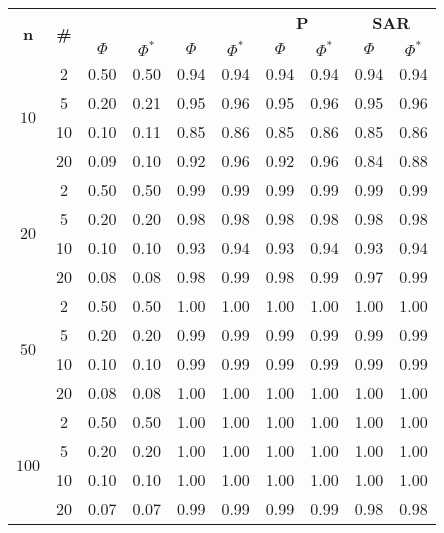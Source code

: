\begin{table}
\begin{small}
		\bigskip
		\begin{tabular}{|c|c|cc|cc|cc|cc|}
			\hline
			\multirow{2}{*}{\textbf{n}} &
			\multirow{2}{*}{\textbf{\#}} &
			\multicolumn{2}{c|}{\textbf{\astar}} &
			\multicolumn{2}{c|}{\textbf{\ambush}} &
			\multicolumn{2}{c|}{\textbf{P}} &
			\multicolumn{2}{c|}{\textbf{SAR}}\\
			& & $\Phi$ & $\Phi^*$ & $\Phi$ & $\Phi^*$&
			$\Phi$ & $\Phi^*$& $\Phi$ & $\Phi^*$\\
			\hline
			\multirow{4}{*}{$10$}
			& 2 & 0.50 & 0.50 & 0.94 & 0.94 & 0.94 & 0.94 & 0.94 & 0.94\\
			& 5 & 0.20 & 0.21 & 0.95 & 0.96 & 0.95 & 0.96 & 0.95 & 0.96\\
			& 10 & 0.10 & 0.11 & 0.85 & 0.86 & 0.85 & 0.86 & 0.85 & 0.86\\
			& 20 & 0.09 & 0.10 & 0.92 & 0.96 & 0.92 & 0.96 & 0.84 & 0.88\\
			\hline
			\multirow{4}{*}{$20$}
			& 2 & 0.50 & 0.50 & 0.99 & 0.99 & 0.99 & 0.99 & 0.99 & 0.99\\
			& 5 & 0.20 & 0.20 & 0.98 & 0.98 & 0.98 & 0.98 & 0.98 & 0.98\\
			& 10 & 0.10 & 0.10 & 0.93 & 0.94 & 0.93 & 0.94 & 0.93 & 0.94\\
			& 20 & 0.08 & 0.08 & 0.98 & 0.99 & 0.98 & 0.99 & 0.97 & 0.99\\
			\hline
			\multirow{4}{*}{$50$}
			& 2 & 0.50 & 0.50 & 1.00 & 1.00 & 1.00 & 1.00 & 1.00 & 1.00\\
			& 5 & 0.20 & 0.20 & 0.99 & 0.99 & 0.99 & 0.99 & 0.99 & 0.99\\
			& 10 & 0.10 & 0.10 & 0.99 & 0.99 & 0.99 & 0.99 & 0.99 & 0.99\\
			& 20 & 0.08 & 0.08 & 1.00 & 1.00 & 1.00 & 1.00 & 1.00 & 1.00\\
			 \hline
			\multirow{4}{*}{$100$}
			& 2 & 0.50 & 0.50 & 1.00 & 1.00 & 1.00 & 1.00 & 1.00 & 1.00\\
			& 5 & 0.20 & 0.20 & 1.00 & 1.00 & 1.00 & 1.00 & 1.00 & 1.00\\
			& 10 & 0.10 & 0.10 & 1.00 & 1.00 & 1.00 & 1.00 & 1.00 & 1.00\\
			& 20 & 0.07 & 0.07 & 0.99 & 0.99 & 0.99 & 0.99 & 0.98 & 0.98\\
			\hline
		\end{tabular}
	\end{small}
\end{table}
